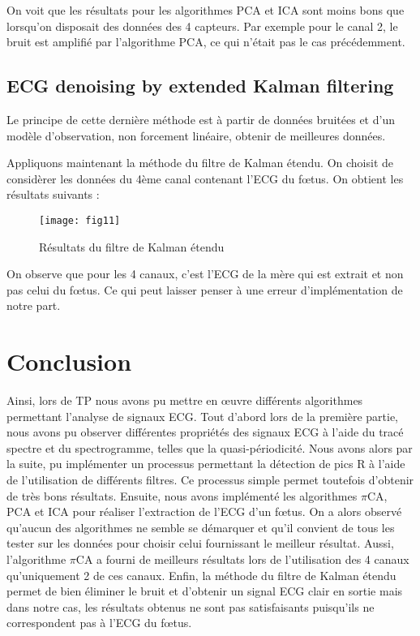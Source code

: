 \documentclass[12pt,a4paper,titlepage]{article}
\begin{document}
On voit que les résultats pour les algorithmes PCA et ICA sont moins bons que lorsqu'on
disposait des données des 4 capteurs. Par exemple pour le canal 2, le bruit est amplifié
par l'algorithme PCA, ce qui n'était pas le cas précédemment.

\subsection{ECG denoising by extended Kalman filtering}

Le principe de cette dernière méthode est à partir de données bruitées et d'un modèle
d'observation, non forcement linéaire, obtenir de meilleures données.

Appliquons maintenant la méthode du filtre de Kalman étendu.
On choisit de considèrer les données du 4ème canal contenant l'ECG du fœtus. 
On obtient les résultats suivants :

\begin{figure}[H]
    \caption{Résultats du filtre de Kalman étendu}
    \texttt{[image: fig11]}
    \centering
\end{figure}

On observe que pour les 4 canaux, c'est l'ECG de la mère qui est extrait et non pas
celui du fœtus. Ce qui peut laisser penser à une erreur d'implémentation de notre part. 

\section*{Conclusion}

Ainsi, lors de TP nous avons pu mettre en œuvre différents algorithmes permettant l'analyse
de signaux ECG. Tout d'abord lors de la première partie, nous avons pu observer différentes
propriétés des signaux ECG à l'aide du tracé spectre et du spectrogramme, telles que la quasi-périodicité. 
Nous avons alors par la suite, pu implémenter
un processus permettant la détection de pics R à l'aide de l'utilisation de différents
filtres. Ce processus simple permet toutefois d'obtenir de très bons résultats. Ensuite, nous
avons implémenté les algorithmes $\pi$CA, PCA et ICA pour réaliser l'extraction de l'ECG d'un
fœtus. On a alors observé qu'aucun des algorithmes ne semble se démarquer et qu'il convient
de tous les tester sur les données pour choisir celui fournissant le meilleur résultat. Aussi,
l'algorithme $\pi$CA a fourni de meilleurs résultats lors de l'utilisation des 4 canaux 
qu'uniquement 2 de ces canaux. Enfin, la méthode du filtre de Kalman étendu permet
de bien éliminer le bruit et d'obtenir un signal ECG clair en sortie mais dans notre cas,
les résultats obtenus ne sont pas satisfaisants puisqu'ils ne correspondent pas à l'ECG
du fœtus.
\end{document}
